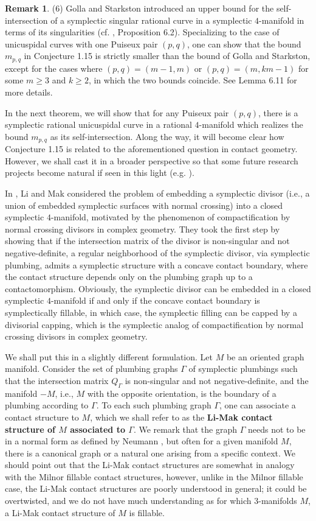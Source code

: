 \documentclass[11pt]{amsart}
\theoremstyle{plain}
\numberwithin{theorem}{section}
\theoremstyle{definition}
\newtheorem{remark}[theorem]{Remark}
\begin{document}
\begin{remark}
(6) Golla and Starkston introduced an upper bound for the self-intersection of a symplectic singular rational curve in a symplectic $4$-manifold in terms of its singularities (cf. \cite{GS2}, Proposition 6.2). Specializing to the case of unicuspidal curves with one Puiseux pair $(p,q)$, one can show that the bound $m_{p,q}$ in Conjecture 1.15 is strictly smaller than the bound of Golla and Starkston, except for the cases where $(p,q)=(m-1,m)$ or $(p,q)=(m,km-1)$ for some $m\geq 3$ and $k\geq 2$, in which the two bounds coincide.  See Lemma 6.11 for more details.  
\end{remark}

In the next theorem, we will show that for any Puiseux pair $(p,q)$, there is a symplectic rational unicuspidal curve in a rational $4$-manifold which realizes the bound $m_{p,q}$ as its self-intersection. Along the way, it will become clear how Conjecture 1.15 is related to the aforementioned question in contact geometry. However, we shall cast it in a broader perspective so that some future research projects become natural if seen in this light (e.g. \cite{C4}).

In \cite{LM}, Li and Mak considered the problem of embedding a symplectic divisor (i.e., a union of embedded symplectic surfaces with normal crossing) into a closed symplectic $4$-manifold, motivated by the phenomenon of compactification by normal crossing divisors in complex geometry. They took the first step by showing that if the intersection matrix of the divisor is non-singular and not negative-definite, a regular neighborhood of the symplectic divisor, via symplectic plumbing, admits a symplectic structure with a concave contact boundary, where the contact structure depends only on the plumbing graph up to a contactomorphism. Obviously, the symplectic divisor can be embedded in a closed symplectic $4$-manifold if and only if the concave contact boundary is symplectically fillable,
in which case, the symplectic filling can be capped by a divisorial capping, which is the symplectic analog of compactification by normal crossing divisors in complex geometry. 

We shall put this in a slightly different formulation. Let $M$ be an oriented graph manifold. Consider the set of plumbing graphs $\Gamma$ of symplectic plumbings such that the intersection matrix $Q_\Gamma$ is non-singular and not negative-definite, and the manifold $-M$, i.e., $M$ with the opposite orientation, is the boundary of a plumbing according to $\Gamma$. To each such plumbing graph $\Gamma$, one can associate a contact structure to $M$, which we shall refer to as the  
{\bf Li-Mak contact structure of $M$ associated to $\Gamma$}. We remark that the graph $\Gamma$ needs not to be in a normal form as defined by Neumann \cite{N1}, but often for a given manifold $M$, there is a canonical graph or a natural one arising from a specific context. We should point out that the Li-Mak contact structures are somewhat in analogy with the Milnor fillable contact structures, however, unlike in the Milnor fillable case, the Li-Mak contact structures are poorly understood in general; it could be overtwisted, and we do not have much understanding as for which $3$-manifolds $M$, a Li-Mak contact structure of $M$ is fillable. 
\end{document}
